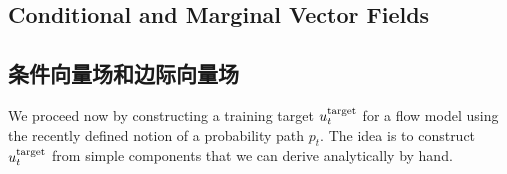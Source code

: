 


\subsection{Conditional and Marginal Vector Fields}

\subsection{条件向量场和边际向量场}

We proceed now by constructing a training target $u^{\text{target}}_t$ for a flow model using the recently defined notion of a probability path $p_t$. The idea is to construct $u^{\text{target}}_t$ from simple components that we can derive analytically by hand.

